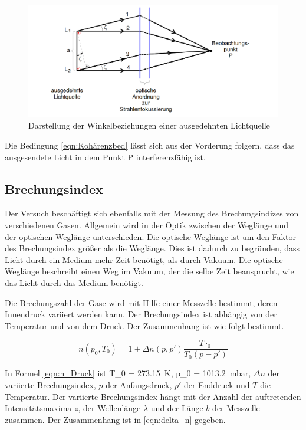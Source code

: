 \begin{figure}
  \centering
  \includegraphics[width=\textwidth]{ausgedehnte_Quelle.png}
  \caption{Darstellung der Winkelbeziehungen einer ausgedehnten Lichtquelle\cite{sample}}
  \label{fig:ausgedehnte_Quelle}
\end{figure}

Die Bedingung \eqref{eqn:Kohärenzbed} lässt sich aus der Vorderung folgern, dass
das ausgesendete Licht in dem Punkt P interferenzfähig ist.

\subsection{Brechungsindex}

Der Versuch beschäftigt sich ebenfalls mit der Messung des Brechungsindizes von
verschiedenen Gasen. Allgemein wird in der Optik zwischen der Weglänge und der
optischen Weglänge unterschieden. Die optische Weglänge ist um den Faktor des
Brechungsindex größer als die Weglänge. Dies ist dadurch zu begründen, dass
Licht durch ein Medium mehr Zeit benötigt, als durch Vakuum. Die optische Weglänge
beschreibt einen Weg im Vakuum, der die selbe Zeit beansprucht, wie das Licht
durch das Medium benötigt.

Die Brechungszahl der Gase wird mit Hilfe einer Messzelle bestimmt, deren Innendruck
variiert werden kann. Der Brechungsindex ist abhängig von der Temperatur und von
dem Druck. Der Zusammenhang ist wie folgt bestimmt.

\begin{equation}
  \label{eqn:n_Druck}
  n\left(p_0, T_0\right) = 1 + \Delta n\left(p, p'\right)\frac{T\cdotp_0}{T_0\left(p - p'\right)}
\end{equation}

In Formel \eqref{eqn:n_Druck} ist T_0 = \SI{273,15}{\kelvin}, p_0 = \SI{1013,2}{\milli\bar},
$\Delta n$ der variierte Brechungsindex, $p$ der Anfangsdruck, $p'$ der Enddruck
und $T$ die Temperatur. Der variierte Brechungsindex hängt mit der Anzahl der
auftretenden Intensitätsmaxima $z$, der Wellenlänge $\lambda$ und der Länge
$b$ der Messzelle zusammen. Der Zusammenhang ist in \eqref{eqn:delta_n} gegeben.

